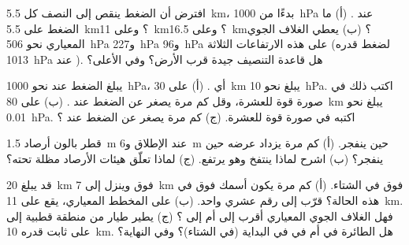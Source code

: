\begin{exercise}[$\star\star$]\label{exo:g8:the-atmosphere:7}
افترض أن الضغط ينقص إلى النصف كل \qty{5.5}{km}، بدءًا من
\qty{1000}{hPa} عند . (أ) ما الضغط على  \qty{5.5}{km}؟
وعلى  \qty{11}{km}؟ وعلى  \qty{16.5}{km}؟ (ب) يعطي الغلاف الجوي
المعياري نحو \qty{506}{hPa} و\qty{227}{hPa} و\qty{96}{hPa} على هذه
الارتفاعات الثلاثة (لضغط قدره \qty{1013}{hPa} عند ). هل
قاعدة التنصيف جيدة قرب الأرض؟ وفي الأعلى؟
\end{exercise}

\begin{exercise}[$\star\star$]\label{exo:g8:the-atmosphere:8}
يبلغ الضغط عند  نحو \qty{1000}{hPa}، أي .
(أ) على  \qty{30}{km} يبلغ نحو \qty{10}{hPa}. اكتب ذلك في صورة قوة
للعشرة، وقل كم مرة يصغر عن الضغط عند . (ب) على 
\qty{80}{km} يبلغ نحو \qty{0.01}{hPa}. اكتبه في صورة قوة للعشرة.
(ج) كم مرة يصغر عن الضغط عند ؟
\end{exercise}

\begin{exercise}[$\star\star$]\label{exo:g8:the-atmosphere:9}
قطر بالون أرصاد \qty{1.5}{m} عند الإطلاق و\qty{6}{m}
حين ينفجر. (أ) كم مرة يزداد عرضه حين ينفجر؟
(ب) اشرح لماذا ينتفخ وهو يرتفع. (ج) لماذا تعلّق هيئات الأرصاد
مظلة تحته؟
\end{exercise}

\begin{exercise}[$\star\star$]\label{exo:g8:the-atmosphere:10}
قد يبلغ  \qty{20}{km} فوق  وينزل إلى
\qty{7}{km} فوق  في الشتاء. (أ) كم مرة يكون  أسمك فوق  في هذه الحالة؟ قرّب إلى رقم عشري واحد. (ب) على المخطط المعياري،
يقع  على  \qty{11}{km}. فهل الغلاف الجوي المعياري أقرب
إلى  أم إلى ؟ (ج) يطير طيار من منطقة قطبية إلى  على  ثابت قدره \qty{10}{km}. هل الطائرة في  أم في
 في البداية (في الشتاء)؟ وفي النهاية؟
\end{exercise}

